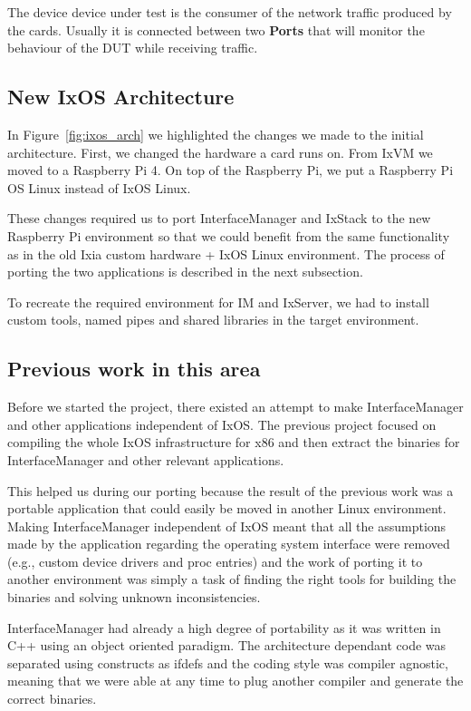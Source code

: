 The device device under test is the consumer of the network traffic produced by
the cards. Usually it is connected between two \textbf{Ports} that will monitor the
behaviour of the DUT while receiving traffic.

\subsection{New IxOS Architecture}

In Figure~\ref{fig:ixos_arch} we highlighted the changes we made to the initial
architecture. First, we changed the hardware a card runs on. From IxVM we moved
to a Raspberry Pi 4. On top of the Raspberry Pi, we put a Raspberry Pi OS Linux
instead of IxOS Linux.

These changes required us to port InterfaceManager and IxStack to the new
Raspberry Pi environment so that we could benefit from the same functionality as in the
old Ixia custom hardware + IxOS Linux environment. The process of porting the
two applications is described in the next subsection.

To recreate the required environment for IM and IxServer, we had to install
custom tools, named pipes and shared libraries in the target environment.

\subsection{Previous work in this area}

Before we started the project, there existed an attempt to make InterfaceManager
and other applications independent of IxOS. The previous project focused on
compiling the whole IxOS infrastructure for x86 and then extract the binaries
for InterfaceManager and other relevant applications.

This helped us during our porting because the result of the previous work was a
portable application that could easily be moved in another Linux environment.
Making InterfaceManager independent of IxOS meant that all the assumptions made
by the application regarding the operating system interface were removed (e.g.,
custom device drivers and proc entries) and the work of porting it to another
environment was simply a task of finding the right tools for building the
binaries and solving unknown inconsistencies.

InterfaceManager had already a high degree of portability as it was written
in C++ using an object oriented paradigm. The architecture dependant code was
separated using constructs as ifdefs and the coding style was compiler agnostic,
meaning that we were able at any time to plug another compiler and generate the
correct binaries.

